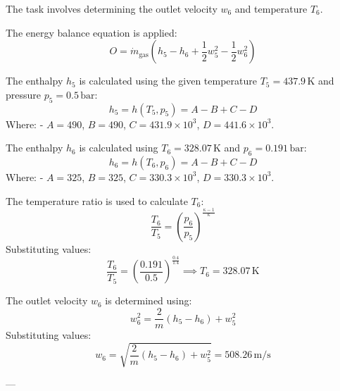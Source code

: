 The task involves determining the outlet velocity \( w_6 \) and temperature \( T_6 \).  

The energy balance equation is applied:  
\[
O = \dot{m}_{\text{gas}} \left( h_5 - h_6 + \frac{1}{2} w_5^2 - \frac{1}{2} w_6^2 \right)
\]

The enthalpy \( h_5 \) is calculated using the given temperature \( T_5 = 437.9 \, \text{K} \) and pressure \( p_5 = 0.5 \, \text{bar} \):  
\[
h_5 = h(T_5, p_5) = A - B + C - D
\]
Where:  
- \( A = 490 \), \( B = 490 \), \( C = 431.9 \times 10^3 \), \( D = 441.6 \times 10^3 \).  

The enthalpy \( h_6 \) is calculated using \( T_6 = 328.07 \, \text{K} \) and \( p_6 = 0.191 \, \text{bar} \):  
\[
h_6 = h(T_6, p_6) = A - B + C - D
\]
Where:  
- \( A = 325 \), \( B = 325 \), \( C = 330.3 \times 10^3 \), \( D = 330.3 \times 10^3 \).  

The temperature ratio is used to calculate \( T_6 \):  
\[
\frac{T_6}{T_5} = \left( \frac{p_6}{p_5} \right)^{\frac{\kappa - 1}{\kappa}}
\]
Substituting values:  
\[
\frac{T_6}{T_5} = \left( \frac{0.191}{0.5} \right)^{\frac{0.4}{1.4}} \implies T_6 = 328.07 \, \text{K}
\]

The outlet velocity \( w_6 \) is determined using:  
\[
w_6^2 = \frac{2}{m} \left( h_5 - h_6 \right) + w_5^2
\]
Substituting values:  
\[
w_6 = \sqrt{\frac{2}{m} \left( h_5 - h_6 \right) + w_5^2} = 508.26 \, \text{m/s}
\]  

---